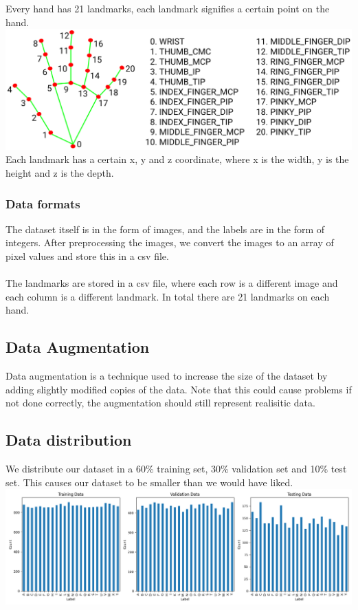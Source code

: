 \documentclass[../paper.tex]{subfiles}
\begin{document}
    Every hand has 21 landmarks, each landmark signifies a certain point on the hand.
    \includegraphics[width=\linewidth]{hand_landmarks}
    Each landmark has a certain x, y and z coordinate, where x is the width, y is the height and z is the depth.

    \subsubsection{Data formats}
    The dataset itself is in the form of images, and the labels are in the form of integers. 
    After preprocessing the images, we convert the images to an array of pixel values and store this in a csv file.
    \\\\
    The landmarks are stored in a csv file, where each row is a different image and each column is a different landmark.
    In total there are 21 landmarks on each hand.

    \subsection{Data Augmentation}
    Data augmentation is a technique used to increase the size of the dataset by adding slightly modified copies of the data.
    Note that this could cause problems if not done correctly, the augmentation should still represent realisitic data.

    \subsection{Data distribution}
    We distribute our dataset in a 60\% training set, 30\% validation set and 10\% test set.
    This causes our dataset to be smaller than we would have liked.
    \includegraphics[width=\linewidth]{dataset_distribution}

    
\end{document}
